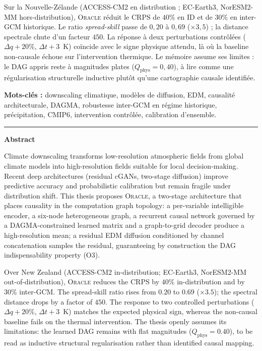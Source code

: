 \documentclass[14pt,a4paper,openany]{extreport}
\theoremstyle{definition}
\newcommand{\Oracle}{\textsc{Oracle}}
\begin{document}
Sur la Nouvelle-Zélande (ACCESS-CM2 en distribution ; EC-Earth3, NorESM2-MM hors-distribution), \Oracle{} réduit le CRPS de $40\%$ en ID et de $30\%$ en inter-GCM historique. Le ratio \emph{spread-skill} passe de $0{,}20$ à $0{,}69$ ($\times 3{,}5$) ; la distance spectrale chute d'un facteur $450$. La réponse à deux perturbations contrôlées ($\Delta q+20\%$, $\Delta t+3$~K) coïncide avec le signe physique attendu, là où la baseline non-causale échoue sur l'intervention thermique. Le mémoire assume ses limites : le DAG appris reste à magnitudes plates ($Q_{\mathrm{phys}}=0{,}40$), à lire comme une régularisation structurelle inductive plutôt qu'une cartographie causale identifiée.

\noindent\textbf{Mots-clés :} downscaling climatique, modèles de diffusion, EDM, causalité architecturale, DAGMA, robustesse inter-GCM en régime historique, précipitation, CMIP6, intervention contrôlée, calibration d'ensemble.

\vspace{0.6em}\hrule\vspace{0.6em}

\begin{center}{\large\bfseries\color{uridarkblue}Abstract}\end{center}

Climate downscaling transforms low-resolution atmospheric fields from global climate models into high-resolution fields suitable for local decision-making. Recent deep architectures (residual cGANs, two-stage diffusion) improve predictive accuracy and probabilistic calibration but remain fragile under distribution shift. This thesis proposes \textsc{Oracle}, a two-stage architecture that places causality in the computation graph topology: a per-variable intelligible encoder, a six-node heterogeneous graph, a recurrent causal network governed by a DAGMA-constrained learned matrix and a graph-to-grid decoder produce a high-resolution mean; a residual EDM diffusion conditioned by channel concatenation samples the residual, guaranteeing by construction the DAG indispensability property (O3).

Over New Zealand (ACCESS-CM2 in-distribution; EC-Earth3, NorESM2-MM out-of-distribution), \textsc{Oracle} reduces the CRPS by $40\%$ in-distribution and by $30\%$ inter-GCM. The spread-skill ratio rises from $0.20$ to $0.69$ ($\times 3.5$); the spectral distance drops by a factor of $450$. The response to two controlled perturbations ($\Delta q+20\%$, $\Delta t+3$~K) matches the expected physical sign, whereas the non-causal baseline fails on the thermal intervention. The thesis openly assumes its limitations: the learned DAG remains with flat magnitudes ($Q_{\mathrm{phys}}=0.40$), to be read as inductive structural regularisation rather than identified causal mapping.
\end{document}
